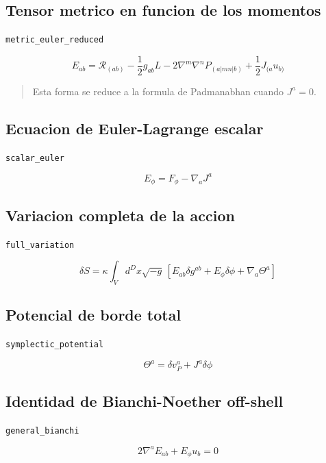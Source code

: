 \documentclass[11pt,a4paper]{article}
\begin{document}
\subsection{Tensor metrico en funcion de los momentos}

\noindent\texttt{metric\_euler\_reduced}\par\nopagebreak[4]

\[
E_{ab} = \mathcal R_{(ab)}-\frac12g_{ab}L-2\nabla^m\nabla^nP_{(a|mn|b)}+\frac12J_{(a}u_{b)}
\]

\begin{quote}\small Esta forma se reduce a la formula de Padmanabhan cuando \(J^a=0\).\end{quote}

\subsection{Ecuacion de Euler-Lagrange escalar}

\noindent\texttt{scalar\_euler}\par\nopagebreak[4]

\[
E_\phi = F_\phi-\nabla_aJ^a
\]

\subsection{Variacion completa de la accion}

\noindent\texttt{full\_variation}\par\nopagebreak[4]

\[
\delta S = \kappa\int_V d^Dx\sqrt{-g}\,[E_{ab}\delta g^{ab}+E_\phi\delta\phi+\nabla_a\Theta^a]
\]

\subsection{Potencial de borde total}

\noindent\texttt{symplectic\_potential}\par\nopagebreak[4]

\[
\Theta^a = \delta v_P^a+J^a\delta\phi
\]

\subsection{Identidad de Bianchi-Noether off-shell}

\noindent\texttt{general\_bianchi}\par\nopagebreak[4]

\[
2\nabla^aE_{ab}+E_\phi u_b = 0
\]
\end{document}
